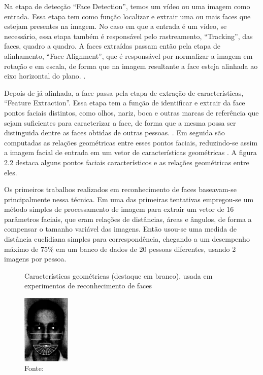 Na etapa de detecção “Face Detection”, temos um vídeo ou uma imagem como entrada. Essa etapa tem como função localizar e extrair uma ou mais faces que estejam presentes na imagem. No caso em que a entrada é um vídeo, se necessário, essa etapa também é responsável pelo rastreamento, “Tracking”, das faces, quadro a quadro. A faces extraídas passam então pela etapa de alinhamento, “Face Alignment”, que é responsável por normalizar a imagem em rotação e em escala, de forma que na imagem resultante a face esteja alinhada ao eixo horizontal do plano. \cite{StanZ.Li2011, Quirita2014}.

Depois de já alinhada, a face passa pela etapa de extração de características, “Feature Extraction”. Essa etapa tem a função de identificar e extrair da face pontos faciais distintos, como olhos, nariz, boca e outras marcas de referência que sejam suficientes para caracterizar a face, de forma que a mesma possa ser distinguida dentre as faces obtidas de outras pessoas. \cite{StanZ.Li2011}. Em seguida são computadas as relações geométricas entre esses pontos faciais, reduzindo-se assim a imagem facial de entrada em um vetor de características geométricas \cite{Jafri2009}. A figura 2.2 destaca alguns pontos faciais característicos e as relações geométricas entre eles.

Os primeiros trabalhos realizados em reconhecimento de faces baseavam-se principalmente nessa técnica. Em uma das primeiras tentativas empregou-se um método simples de processamento de imagem para extrair um vetor de 16 parâmetros faciais, que eram relações de distâncias, áreas e ângulos, de forma a compensar o tamanho variável das imagens. Então usou-se uma medida de distância euclidiana simples para correspondência, chegando a um desempenho máximo de 75\% em um banco de dados de 20 pessoas diferentes, usando 2 imagens por pessoa. \cite{Kanade1977}

\begin{figure}[h]
    \centering
    \caption[Características geométricas (destaque em branco), usada em experimentos de reconhecimento de faces.]{Características geométricas (destaque em branco), usada em experimentos de reconhecimento de faces}
    \includegraphics[width=0.2\textwidth]{Cap2_Revisao_Teorica/Figures/face_vetores.png}
    \caption*{Fonte: \cite{StanZ.Li2011}}
    \label{fig:faceVetores}
\end{figure}

